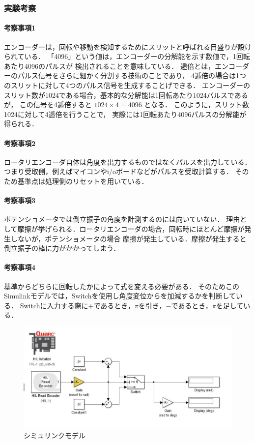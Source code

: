 \subsubsection{実験考察}
\paragraph{考察事項1}
エンコーダーは，回転や移動を検知するためにスリットと呼ばれる目盛りが設けられている．
「4096」という値は，エンコーダーの分解能を示す数値で，1回転あたり4096のパルスが
検出されることを意味している．
逓倍とは，エンコーダーのパルス信号をさらに細かく分割する技術のことであり，
4逓倍の場合は1つのスリットに対して4つのパルス信号を生成することげできる．
エンコーダーのスリット数が1024である場合，基本的な分解能は1回転あたり1024パルスであるが，
この信号を4逓倍すると
\( 1024\times 4=4096 \) となる．
このように，スリット数1024に対して4逓倍を行うことで，
実際には1回転あたり4096パルスの分解能が得られる．

\paragraph{考察事項2}
ロータリエンコーダ自体は角度を出力するものではなくパルスを出力している．
つまり受取側，例えばマイコンやi/oボードなどがパルスを受取計算する．
そのため基準点は処理側のリセットを用いている．


\paragraph{考察事項3}
ポテンショメータでは倒立振子の角度を計測するのには向いていない．
理由として摩擦が挙げられる．ロータリエンコーダの場合，回転時にほとんど摩擦が発生しないが，ポテンショメータの場合
摩擦が発生している．摩擦が発生すると倒立振子の棒に力がかかってしまう．

\paragraph{考察事項4}
基準からどちらに回転したかによって式を変える必要がある．
そのためこのSimulinkモデルでは，Switchを使用し角度変位からを加減するかを判断している．
Switchに入力する際に\( + \)であるとき，\( \pi \)を引き，\( - \)であるとき，\( \pi \)を足している．

\begin{figure}[h]
  \centering
  \includegraphics[scale=0.9]{sozai/pendcount3.pdf}
  \caption{シミュリンクモデル}
\end{figure}


